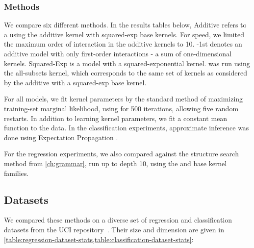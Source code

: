 \subsubsection{Methods}

We compare six different methods.
In the results tables below, \gp{} Additive refers to a \gp{} using the additive kernel with squared-exp base kernels.
For speed, we limited the maximum order of interaction in the additive kernels to 10.
\gp{}-1st denotes an additive \gp{} model with only first-order interactions - a sum of one-dimensional kernels.
\gp{} Squared-Exp is a \gp{} model with a squared-exponential \ARD{} kernel.
\HKL{} was run using the all-subsets kernel, which corresponds to the same set of kernels as considered by the additive \gp{} with a squared-exp base kernel.

For all \gp{} models, we fit kernel parameters by the standard method of maximizing training-set marginal likelihood, using \LBFGS{} \citep{nocedal1980updating} for 500 iterations, allowing five random restarts.
In addition to learning kernel parameters, we fit a constant mean function to the data.
In the classification experiments, approximate \gp{} inference was done using Expectation Propagation \citep{minka2001expectation}.

For the regression experiments, we also compared against the structure search method from \cref{ch:grammar}, run up to depth 10, using the \SE{} and \RQ{} base kernel families.

\subsection{Datasets}

We compared these methods on a diverse set of regression and classification datasets from the UCI repository~\citep{UCI}.  Their size and dimension are given in \cref{table:regression-dataset-stats,table:classification-dataset-stats}:

